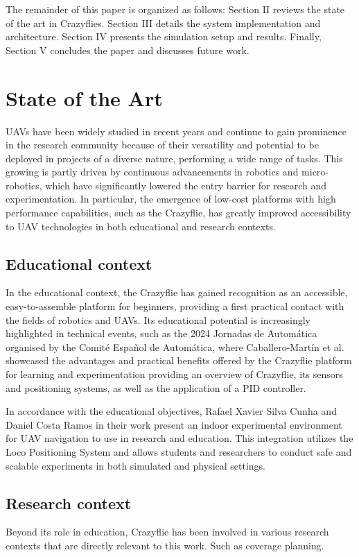\documentclass[conference]{IEEEtran}
\begin{document}
The remainder of this paper is organized as follows: Section II reviews the state of the art in Crazyflies. Section III details the system implementation and architecture. Section IV presents the simulation setup and results. Finally, Section V concludes the paper and discusses future work.

\section{State of the Art}
UAVs have been widely studied in recent years and continue to gain prominence in the research community because of their versatility and potential to be deployed in projects of a diverse nature, performing a wide range of tasks. This growing is partly driven by continuous advancements in robotics and micro-robotics, which have significantly lowered the entry barrier for research and experimentation. In particular, the emergence of low-cost platforms with high performance capabilities, such as the Crazyflie, has greatly improved accessibility to UAV technologies in both educational and research contexts. 

\subsection{Educational context}
In the educational context, the Crazyflie has gained recognition as an accessible, easy-to-assemble platform for beginners, providing a first practical contact with the fields of robotics and UAVs. Its educational potential is increasingly highlighted in technical events, such as the 2024 Jornadas de Automática organised by the Comité Español de Automática, where Caballero-Martín et al. \cite{CaballeroMartin2024} showcased the advantages and practical benefits offered by the Crazyflie platform for learning and experimentation providing an overview of Crazyflie, its sensors and positioning systems, as well as the application of a PID controller.

In accordance with the educational objectives, Rafael Xavier Silva Cunha and Daniel Costa Ramos in their work \cite{11249570} present an indoor experimental environment for UAV navigation to use in research and education. This integration utilizes the Loco Positioning System and allows students and researchers to conduct safe and scalable experiments in both simulated and physical settings.

\subsection{Research context}
Beyond its role in education, Crazyflie has been involved in various research contexts that are directly relevant to this work. Such as coverage planning.  
\end{document}
